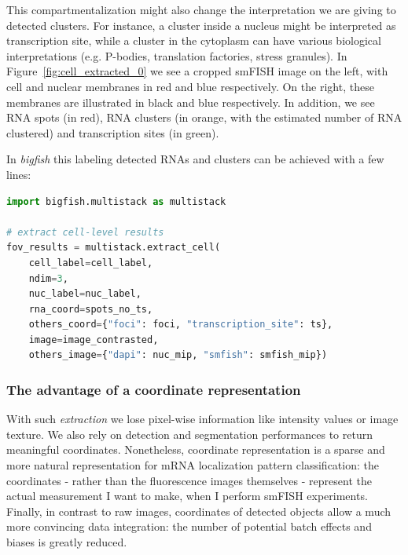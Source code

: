 This compartmentalization might also change the interpretation we are giving to detected clusters. For instance, a cluster inside a nucleus might be interpreted as transcription site, while a cluster in the cytoplasm can have various biological interpretations (e.g. P-bodies, translation factories, stress granules). 
In Figure~\ref{fig:cell_extracted_0} we see a cropped \ac{smFISH} image on the left, with cell and nuclear membranes in red and blue respectively.
On the right, these membranes are illustrated in black and blue respectively. 
In addition, we see \ac{RNA} spots (in red), \ac{RNA} clusters (in orange, with the estimated number of \ac{RNA} clustered) and transcription sites (in green). 

In \emph{bigfish} this labeling detected RNAs and clusters can be achieved with a few lines: \\

\begin{minipage}{0.9\textwidth}
\begin{lstlisting}[language=Python]
import bigfish.multistack as multistack

# extract cell-level results
fov_results = multistack.extract_cell(
    cell_label=cell_label,
    ndim=3,
    nuc_label=nuc_label,
    rna_coord=spots_no_ts,
    others_coord={"foci": foci, "transcription_site": ts},
    image=image_contrasted,
    others_image={"dapi": nuc_mip, "smfish": smfish_mip})
\end{lstlisting}
\end{minipage}


\subsubsection{The advantage of a coordinate representation}
With such \emph{extraction} we lose pixel-wise information like intensity values or image texture.
We also rely on detection and segmentation performances to return meaningful coordinates.
Nonetheless, coordinate representation is a sparse and more natural representation for \ac{mRNA} localization pattern classification: the coordinates - rather than the fluorescence images themselves - represent the actual measurement I want to make, when I perform smFISH experiments. Finally, in contrast to raw images, coordinates of detected objects allow a much more convincing data integration: the number of potential batch effects and biases is greatly reduced. 


